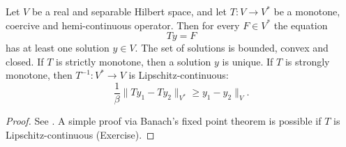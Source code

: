 \documentclass[../skript.tex]{subfiles}
\begin{document}
\begin{theorem} %
\label{thm:c4e4}
Let $V$ be a real and separable Hilbert space, and let $T : V \to V^*$ be a monotone, coercive and hemi-continuous operator. Then for every $F \in V^*$ the equation
\[
	Ty = F
\]
has at least one solution $y \in V$. The set of solutions is bounded, convex and closed. If $T$ is strictly monotone, then a solution $y$ is unique. If $T$ is strongly monotone, then $T^{-1} : V^* \to V$ is Lipschitz-continuous: 
\[
	\frac{1}{\beta} \| T y_1 - T y_2 \|_{V^*} \geq y_1 - y_2 \|_V.
\]
\end{theorem}
\begin{proof}
See \cite{Zeidler2B}. %
A simple proof via Banach's fixed point theorem is possible if $T$ is Lipschitz-continuous (Exercise).
\end{proof}
\end{document}
